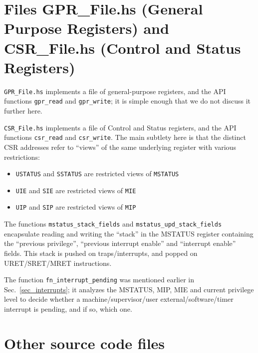 \documentclass[11pt]{article}
\begin{document}

\section{Files GPR\_File.hs (General Purpose Registers) and CSR\_File.hs (Control and Status Registers)}

\label{sec_gprs_csrs}

\verb|GPR_File.hs| implements a file of general-purpose registers, and
the API functions \verb|gpr_read| and \verb|gpr_write|; it is simple
enough that we do not discuss it further here.

\verb|CSR_File.hs| implements a file of Control and Status registers,
and the API functions \verb|csr_read| and \verb|csr_write|.  The main
subtlety here is that the distinct CSR addresses refer to ``views'' of
the same underlying register with various restrictions:

\begin{itemize}
\item
\verb|USTATUS| and \verb|SSTATUS| are restricted views of \verb|MSTATUS|

\item
\verb|UIE| and \verb|SIE| are restricted views of \verb|MIE|

\item
\verb|UIP| and \verb|SIP| are restricted views of \verb|MIP|
\end{itemize}


The functions \verb|mstatus_stack_fields| and
\verb|mstatus_upd_stack_fields| encapsulate reading and writing the
``stack'' in the MSTATUS register containing the ``previous
privilege'', ``previous interrupt enable'' and ``interrupt enable''
fields.  This stack is pushed on traps/interrupts, and popped on
URET/SRET/MRET instructions.

The function \verb|fn_interrupt_pending| was mentioned earlier in
Sec.~\ref{sec_interrupts}; it analyzes the MSTATUS, MIP, MIE and
current privilege level to decide whether a machine/supervisor/user
external/software/timer interrupt is pending, and if so, which one.


\section{Other source code files}
\end{document}
